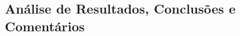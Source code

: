 \documentclass[a4paper,12pt]{article}  %
\begin{document}
\subsection{\sf Análise de Resultados, Conclusões e Comentários}
\noindent\underline{\makebox[\textwidth][r]{~}} \\
\noindent\underline{\makebox[\textwidth][r]{~}} \\
\noindent\underline{\makebox[\textwidth][r]{~}} \\
\noindent\underline{\makebox[\textwidth][r]{~}} \\
\noindent\underline{\makebox[\textwidth][r]{~}} \\
\noindent\underline{\makebox[\textwidth][r]{~}} \\
\noindent\underline{\makebox[\textwidth][r]{~}} \\
\noindent\underline{\makebox[\textwidth][r]{~}} \\
\noindent\underline{\makebox[\textwidth][r]{~}} \\
\noindent\underline{\makebox[\textwidth][r]{~}} \\
\noindent\underline{\makebox[\textwidth][r]{~}} \\
\noindent\underline{\makebox[\textwidth][r]{~}} \\
\noindent\underline{\makebox[\textwidth][r]{~}} \\
\noindent\underline{\makebox[\textwidth][r]{~}} \\
\noindent\underline{\makebox[\textwidth][r]{~}} \\




\end{document}
